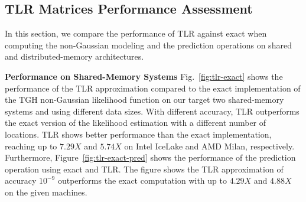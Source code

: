 \documentclass[conference]{IEEEtran}
\begin{document}



\subsection{TLR Matrices Performance Assessment}
In this section, we compare the performance of TLR 
against exact when computing the non-Gaussian modeling and the prediction operations
on shared and distributed-memory architectures. 



\textbf{Performance on Shared-Memory Systems}
Fig.~\ref{fig:tlr-exact} shows the performance of the
TLR approximation compared to the exact implementation
of the TGH non-Gaussian likelihood function on our target two
shared-memory systems and using different data sizes.  With different accuracy, TLR outperforms the exact version of the likelihood estimation with a different number of locations. TLR shows better performance than the exact implementation, reaching up to $7.29X$ and $5.74X$ on Intel IceLake and AMD Milan, respectively.   Furthermore, Figure~\ref{fig:tlr-exact-pred} shows the performance of the prediction operation using
exact and TLR. The figure shows the TLR approximation of
accuracy $10^{-9}$ outperforms the exact computation with
up to $4.29X$ and $4.88X$ on the given machines.
\end{document}
